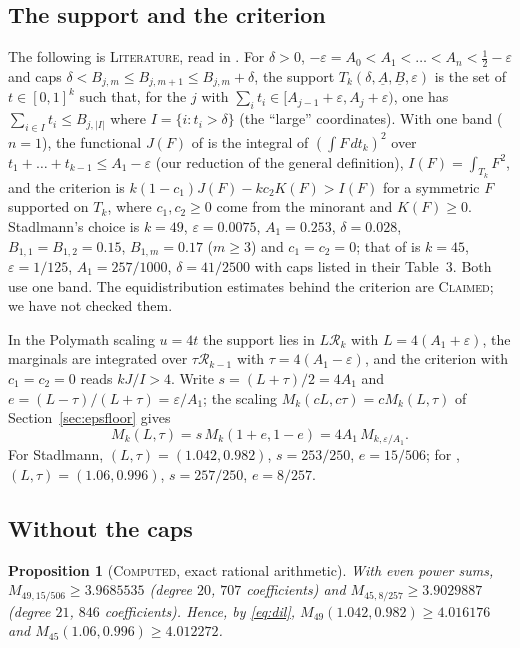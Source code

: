 \documentclass[11pt]{amsart}
\newtheorem{proposition}[theorem]{Proposition}
\theoremstyle{definition}
\theoremstyle{remark}
\newcommand{\lbl}[1]{\textup{\textsc{#1}}}
\newcommand{\R}{\mathcal{R}}
\begin{document}
\subsection*{The support and the criterion}
The following is \lbl{Literature}, read in \cite[Def.~1, Def.~5, Prop.~1]{Sta26}.
For $\delta>0$, $-\varepsilon=A_0<A_1<\dots<A_n<\frac12-\varepsilon$ and caps
$\delta<B_{j,m}\le B_{j,m+1}\le B_{j,m}+\delta$, the support
$T_k(\delta,\underline A,\underline B,\varepsilon)$ is the set of
$t\in[0,1]^k$ such that, for the $j$ with
$\sum_it_i\in[A_{j-1}+\varepsilon,A_j+\varepsilon)$, one has
$\sum_{i\in I}t_i\le B_{j,|I|}$ where $I=\{i:t_i>\delta\}$ (the ``large''
coordinates). With one band ($n=1$), the functional $J(F)$ of \cite{Sta26}
is the integral of $\left(\int F\,dt_k\right)^2$ over
$t_1+\dots+t_{k-1}\le A_1-\varepsilon$ (our reduction of the general
definition), $I(F)=\int_{T_k}F^2$, and the criterion is
$k(1-c_1)J(F)-kc_2K(F)>I(F)$ for a symmetric $F$ supported on $T_k$, where
$c_1,c_2\ge0$ come from the minorant and $K(F)\ge0$. Stadlmann's choice is
$k=49$, $\varepsilon=0.0075$, $A_1=0.253$, $\delta=0.028$,
$B_{1,1}=B_{1,2}=0.15$, $B_{1,m}=0.17$ ($m\ge3$) and $c_1=c_2=0$; that of
\cite{Cha26} is $k=45$, $\varepsilon=1/125$, $A_1=257/1000$,
$\delta=41/2500$ with caps listed in their Table~3. Both use one band. The
equidistribution estimates behind the criterion are \lbl{Claimed}; we have not
checked them.

In the Polymath scaling $u=4t$ the support lies in $L\R_k$ with
$L=4(A_1+\varepsilon)$, the marginals are integrated over $\tau\R_{k-1}$ with
$\tau=4(A_1-\varepsilon)$, and the criterion with $c_1=c_2=0$ reads
$kJ/I>4$. Write $s=(L+\tau)/2=4A_1$ and $e=(L-\tau)/(L+\tau)=\varepsilon/A_1$;
the scaling $M_k(cL,c\tau)=cM_k(L,\tau)$ of Section~\ref{sec:epsfloor} gives
\begin{equation}\label{eq:dil}
M_k(L,\tau)=s\,M_k(1+e,1-e)=4A_1\,M_{k,\varepsilon/A_1}.
\end{equation}
For Stadlmann, $(L,\tau)=(1.042,0.982)$, $s=253/250$, $e=15/506$; for
\cite{Cha26}, $(L,\tau)=(1.06,0.996)$, $s=257/250$, $e=8/257$.

\subsection*{Without the caps}
\begin{proposition}[\lbl{Computed}, exact rational arithmetic]\label{prop:capfree}
With even power sums,
$M_{49,15/506}\ge3.9685535$ (degree $20$, $707$ coefficients) and
$M_{45,8/257}\ge3.9029887$ (degree $21$, $846$ coefficients). Hence, by
\eqref{eq:dil}, $M_{49}(1.042,0.982)\ge4.016176$ and
$M_{45}(1.06,0.996)\ge4.012272$.
\end{proposition}
\end{document}
